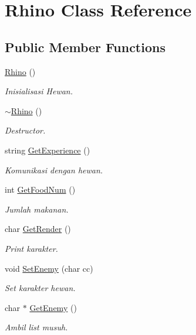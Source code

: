 \hypertarget{class_rhino}{}\section{Rhino Class Reference}
\label{class_rhino}
\subsection*{Public Member Functions}
\begin{DoxyCompactItemize}
\item 
\hyperlink{class_rhino_aa2db135ac8e800310f0531cdbe18bafe}{Rhino} ()\hypertarget{class_rhino_aa2db135ac8e800310f0531cdbe18bafe}{}\label{class_rhino_aa2db135ac8e800310f0531cdbe18bafe}

\begin{DoxyCompactList}\small\item\em Inisialisasi Hewan. \end{DoxyCompactList}\item 
\hyperlink{class_rhino_a6a11f0f8dcd6ed20ef99d8d698b06f28}{$\sim$\+Rhino} ()\hypertarget{class_rhino_a6a11f0f8dcd6ed20ef99d8d698b06f28}{}\label{class_rhino_a6a11f0f8dcd6ed20ef99d8d698b06f28}

\begin{DoxyCompactList}\small\item\em Destructor. \end{DoxyCompactList}\item 
string \hyperlink{class_rhino_a74c81cc9af2162e2c6815059bacf402d}{Get\+Experience} ()\hypertarget{class_rhino_a74c81cc9af2162e2c6815059bacf402d}{}\label{class_rhino_a74c81cc9af2162e2c6815059bacf402d}

\begin{DoxyCompactList}\small\item\em Komunikasi dengan hewan. \end{DoxyCompactList}\item 
int \hyperlink{class_rhino_a3a31a388e2f43865267cbc6f025fd5da}{Get\+Food\+Num} ()
\begin{DoxyCompactList}\small\item\em Jumlah makanan. \end{DoxyCompactList}\item 
char \hyperlink{class_rhino_a8b6eb9e8e19af712e93fcf192afc30b9}{Get\+Render} ()
\begin{DoxyCompactList}\small\item\em Print karakter. \end{DoxyCompactList}\item 
void \hyperlink{class_rhino_a7a19b29742ac6fdddf93142d2c2a838d}{Set\+Enemy} (char cc)
\begin{DoxyCompactList}\small\item\em Set karakter hewan. \end{DoxyCompactList}\item 
char $\ast$ \hyperlink{class_rhino_ac45bb151e13f6ec3df84ab25eb2af5d9}{Get\+Enemy} ()
\begin{DoxyCompactList}\small\item\em Ambil list musuh. \end{DoxyCompactList}\end{DoxyCompactItemize}
